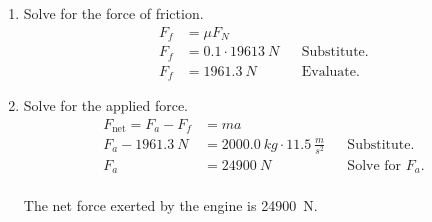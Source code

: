 \documentclass[letterpaper, 12pt]{report}
\begin{document}
\begin{enumerate}
\begin{enumerate}
                \item Solve for the force of friction.
                    \begin{align}
                        F_f &= \mu F_N && \\
                        F_f &= 0.1 \cdot \SI{19613}{N} && \text{Substitute.} \\
                        F_f &= \SI{1961.3}{N} && \text{Evaluate.}
                    \end{align}
                \item Solve for the applied force.
                    \begin{align}
                        F_{\text{net}} = F_a - F_f &= ma && \\
                        F_a - \SI{1961.3}{N} &= \SI{2000.0}{kg} \cdot \SI{11.5}{\frac{m}{s^2}} && \text{Substitute.} \\
                        F_a &= \SI{24900}{N} && \text{Solve for } F_a \text{.}
                    \end{align}
                \hfill
                    \\
                    The net force exerted by the engine is \SI{24900}{N}.
                    \\ 
            \end{enumerate}
\end{enumerate}
\end{document}

